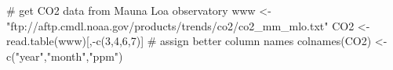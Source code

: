\begin{Schunk}
\begin{Sinput}
 # get CO2 data from Mauna Loa observatory
 www <- "ftp://aftp.cmdl.noaa.gov/products/trends/co2/co2_mm_mlo.txt"
 CO2 <- read.table(www)[,-c(3,4,6,7)]
 # assign better column names
 colnames(CO2) <- c("year","month","ppm")
\end{Sinput}
\end{Schunk}

